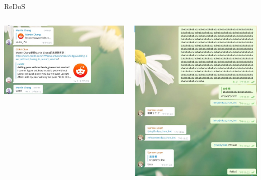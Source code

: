\documentclass{beamer}
\begin{document}
\begin{CJK*}{UTF8}{bsmi}
    \begin{frame}{ReDoS}
        \centering
        \begin{columns}
            \begin{column}{0.5\textwidth}
                \includegraphics[width=1.1\textwidth]{redos1.jpg}
            \end{column}
            \begin{column}{0.5\textwidth}
                \includegraphics[width=1.1\textwidth]{redos2.jpg}
            \end{column}
        \end{columns}
    \end{frame}


\end{CJK*}
\end{document}
